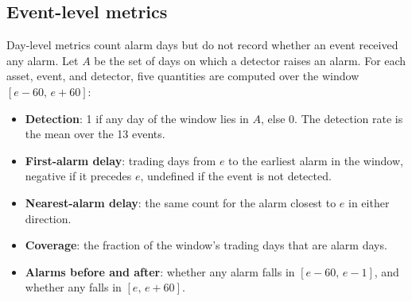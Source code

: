 \documentclass[pdflatex,sn-mathphys-num,iicol]{sn-jnl}
\begin{document}
\subsection{Event-level metrics}
\label{sec:event_metrics}
Day-level metrics count alarm days but do not record whether an event received any alarm. Let $A$ be the set of days on which a detector raises an alarm. For each asset, event, and detector, five quantities are computed over the window $[e-60,\,e+60]$:
\begin{itemize}
\item \textbf{Detection}: 1 if any day of the window lies in $A$, else 0. The detection rate is the mean over the 13 events.
\item \textbf{First-alarm delay}: trading days from $e$ to the earliest alarm in the window, negative if it precedes $e$, undefined if the event is not detected.
\item \textbf{Nearest-alarm delay}: the same count for the alarm closest to $e$ in either direction.
\item \textbf{Coverage}: the fraction of the window's trading days that are alarm days.
\item \textbf{Alarms before and after}: whether any alarm falls in $[e-60,\,e-1]$, and whether any falls in $[e,\,e+60]$.
\end{itemize}
\end{document}
